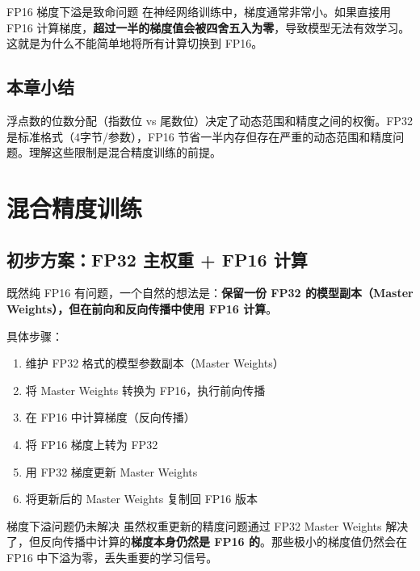 \documentclass[a4paper]{article}
\begin{document}


\begin{warningbox}{FP16 梯度下溢是致命问题}
在神经网络训练中，梯度通常非常小。如果直接用 FP16 计算梯度，\textbf{超过一半的梯度值会被四舍五入为零}，导致模型无法有效学习。这就是为什么不能简单地将所有计算切换到 FP16。
\end{warningbox}

\subsection{本章小结}

浮点数的位数分配（指数位 vs 尾数位）决定了动态范围和精度之间的权衡。FP32 是标准格式（4字节/参数），FP16 节省一半内存但存在严重的动态范围和精度问题。理解这些限制是混合精度训练的前提。


\section{混合精度训练}

\subsection{初步方案：FP32 主权重 + FP16 计算}

既然纯 FP16 有问题，一个自然的想法是：\textbf{保留一份 FP32 的模型副本（Master Weights），但在前向和反向传播中使用 FP16 计算}。





具体步骤：
\begin{enumerate}
    \item 维护 FP32 格式的模型参数副本（Master Weights）
    \item 将 Master Weights 转换为 FP16，执行前向传播
    \item 在 FP16 中计算梯度（反向传播）
    \item 将 FP16 梯度上转为 FP32
    \item 用 FP32 梯度更新 Master Weights
    \item 将更新后的 Master Weights 复制回 FP16 版本
\end{enumerate}

\begin{warningbox}{梯度下溢问题仍未解决}
虽然权重更新的精度问题通过 FP32 Master Weights 解决了，但反向传播中计算的\textbf{梯度本身仍然是 FP16 的}。那些极小的梯度值仍然会在 FP16 中下溢为零，丢失重要的学习信号。
\end{warningbox}
\end{document}
